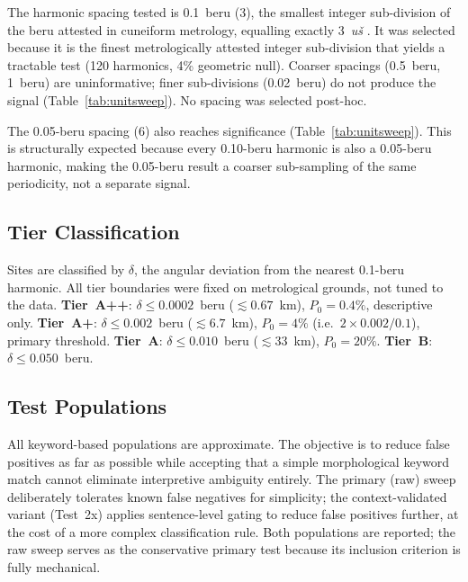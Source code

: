 \documentclass[HARVARD,twocolumn]{USG}
\begin{document}
The harmonic spacing tested is 0.1~beru (3\textdegree{}), the smallest integer
sub-division of the beru attested in cuneiform metrology, equalling exactly
3~\textit{u\v{s}} \citep{hunger2019mul,robson2008mathematics,powell1987metrological}.
It was selected because it is the finest metrologically attested integer
sub-division that yields a tractable test (120 harmonics, 4\% geometric null).
Coarser spacings (0.5~beru, 1~beru) are uninformative; finer sub-divisions
(0.02~beru) do not produce the signal (Table~\ref{tab:unitsweep}).
No spacing was selected post-hoc.

The 0.05-beru spacing (6\textdegree{}) also reaches significance
(Table~\ref{tab:unitsweep}). This is structurally expected because every
0.10-beru harmonic is also a 0.05-beru harmonic, making the 0.05-beru
result a coarser sub-sampling of the same periodicity, not a separate signal.

\subsection{Tier Classification}

Sites are classified by $\delta$, the angular deviation from the
nearest 0.1-beru harmonic. All tier boundaries were fixed on metrological
grounds, not tuned to the data.
\textbf{Tier~A++}: $\delta \leq 0.0002$~beru ($\lesssim 0.67$~km), $P_0 = 0.4\%$, descriptive only.
\textbf{Tier~A+}: $\delta \leq 0.002$~beru ($\lesssim 6.7$~km), $P_0 = 4\%$ (i.e.\ $2 \times 0.002/0.1$), primary threshold.
\textbf{Tier~A}: $\delta \leq 0.010$~beru ($\lesssim 33$~km), $P_0 = 20\%$.
\textbf{Tier~B}: $\delta \leq 0.050$~beru.

\subsection{Test Populations}
\label{sec:test_populations}

All keyword-based populations are approximate. The objective is to
reduce false positives as far as possible while accepting that a
simple morphological keyword match cannot eliminate interpretive
ambiguity entirely. The primary (raw) sweep deliberately tolerates
known false negatives for simplicity; the context-validated variant
(Test~2x) applies sentence-level gating to reduce false positives
further, at the cost of a more complex classification rule.
Both populations are reported; the raw sweep serves as the
conservative primary test because its inclusion criterion is
fully mechanical.
\end{document}
